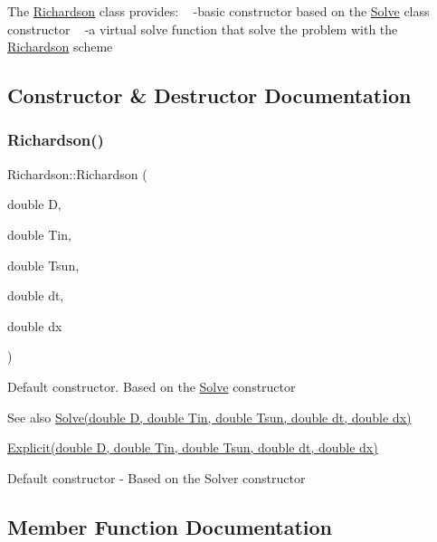 The \hyperlink{class_richardson}{Richardson} class provides\+: ~\newline
-\/basic constructor based on the \hyperlink{class_solve}{Solve} class constructor ~\newline
-\/a virtual solve function that solve the problem with the \hyperlink{class_richardson}{Richardson} scheme 

\subsection{Constructor \& Destructor Documentation}
\mbox{\label{class_richardson_ab669d2d69be9d899d5ca2bb7a7c33a5b}} 
\subsubsection{\texorpdfstring{Richardson()}{Richardson()}}
{\footnotesize\ttfamily Richardson\+::\+Richardson (\begin{DoxyParamCaption}\item[{double}]{D,  }\item[{double}]{Tin,  }\item[{double}]{Tsun,  }\item[{double}]{dt,  }\item[{double}]{dx }\end{DoxyParamCaption})}

Default constructor. Based on the \hyperlink{class_solve}{Solve} constructor \begin{DoxySeeAlso}{See also}
\hyperlink{class_solve_a1e0efad6dcf6b09759dd38df7aa08db8}{Solve(double D, double Tin, double Tsun, double dt, double dx)} 

\hyperlink{class_explicit_ab5b890fae2ea8a91c95e9a15f552f36a}{Explicit(double D, double Tin, double Tsun, double dt, double dx)}
\end{DoxySeeAlso}
Default constructor -\/ Based on the Solver constructor 

\subsection{Member Function Documentation}
\mbox{\label{class_richardson_ab8dd2ff0e58c11092fead4d45a4f5c64}} 
